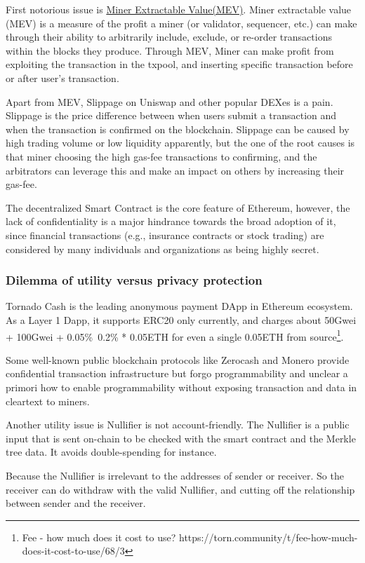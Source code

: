 \documentclass{article}
\begin{document}
First notorious issue is \href{https://ethereum.org/en/developers/docs/mev/}{Miner Extractable Value(MEV)}. Miner extractable value (MEV) is a measure of the profit a miner (or validator, sequencer, etc.) can make through their ability to arbitrarily include, exclude, or re-order transactions within the blocks they produce.  Through MEV, Miner can make profit from exploiting the transaction in the txpool, and inserting specific transaction before or after user's transaction.

Apart from MEV, Slippage on Uniswap and other popular DEXes is a pain. Slippage is the price difference between when users submit a transaction and when the transaction is confirmed on the blockchain. Slippage can be caused by high trading volume or low liquidity apparently, but the one of the root causes is that miner choosing the high gas-fee transactions to confirming, and the arbitrators can leverage this and make an impact on others by increasing their gas-fee.

The decentralized Smart Contract is the core feature of Ethereum, however, the lack of confidentiality is a major hindrance towards the broad adoption of it, since financial transactions (e.g., insurance contracts or stock trading) are considered by many individuals and organizations as being highly secret. 

\subsubsection{Dilemma of utility versus privacy protection}

Tornado Cash is the leading anonymous payment DApp in Ethereum ecosystem. As a Layer 1 Dapp, it supports ERC20 only currently, and charges about 50Gwei + 100Gwei + 0.05\%~0.2\% * 0.05ETH for even a single 0.05ETH from source\footnote{Fee - how much does it cost to use? https://torn.community/t/fee-how-much-does-it-cost-to-use/68/3}.

Some well-known public blockchain protocols like Zerocash and Monero provide confidential transaction infrastructure but forgo programmability and unclear a primori how to enable programmability without exposing transaction and data in cleartext to miners.

Another utility issue is Nullifier is not account-friendly. The Nullifier is a public input that is sent on-chain to be checked with the smart contract and the Merkle tree data. It avoids double-spending for instance.

Because the Nullifier is irrelevant to the addresses of sender or receiver. So the receiver can do withdraw with the valid Nullifier, and cutting off the relationship between sender and the receiver.
\end{document}
